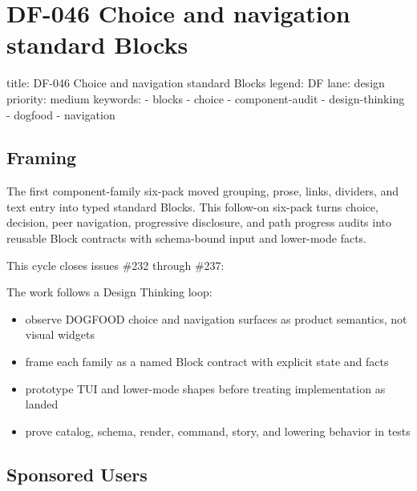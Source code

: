 \chapter{DF-046 Choice and navigation standard Blocks}\label{record-096}

\smallskip

\begin{RecordMeta}
title: DF-046 Choice and navigation standard Blocks
legend: DF
lane: design
priority: medium
keywords:
  - blocks
  - choice
  - component-audit
  - design-thinking
  - dogfood
  - navigation

\end{RecordMeta}

\section{Framing}\label{record-096-framing}

The first component-family six-pack moved grouping, prose, links, dividers, and text entry into typed standard Blocks. This follow-on six-pack turns choice, decision, peer navigation, progressive disclosure, and path progress audits into reusable Block contracts with schema-bound input and lower-mode facts.

This cycle closes issues \#232 through \#237:



The work follows a Design Thinking loop:

\begin{itemize}
\tightlist
\item
  observe DOGFOOD choice and navigation surfaces as product semantics, not visual widgets
\item
  frame each family as a named Block contract with explicit state and facts
\item
  prototype TUI and lower-mode shapes before treating implementation as landed
\item
  prove catalog, schema, render, command, story, and lowering behavior in tests
\end{itemize}

\section{Sponsored Users}\label{record-096-sponsored-users}

